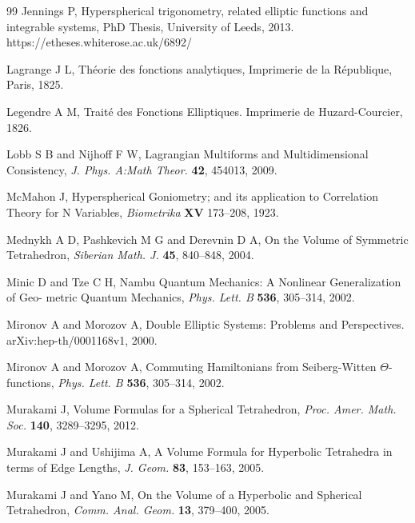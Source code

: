 \documentclass[fleqn,11pt,twoside]{article}
\theoremstyle{definition}
\begin{document}
\begin{thebibliography}{99}
Jennings P, Hyperspherical trigonometry, related elliptic functions and integrable systems, PhD Thesis, University of Leeds, 2013. 
https://etheses.whiterose.ac.uk/6892/

Lagrange J L, Th\'eorie des fonctions analytiques, Imprimerie de la R\'epublique, Paris, 1825. 

Legendre A M, Trait\'e des Fonctions Elliptiques. Imprimerie de Huzard-Courcier, 1826.


Lobb S B and Nijhoff F W, Lagrangian Multiforms and Multidimensional Consistency,
{\it J. Phys. A:Math Theor.} {\bf 42}, 454013, 2009.

McMahon J, Hyperspherical Goniometry; and its application to Correlation Theory for
N Variables, {\it Biometrika} {\bf XV} 173--208, 1923.


Mednykh A D, Pashkevich M G and Derevnin D A, On the Volume of 
Symmetric Tetrahedron, {\it Siberian Math. J.} {\bf 45}, 840--848, 2004.

Minic D and Tze C H, Nambu Quantum Mechanics: A Nonlinear Generalization of Geo-
metric Quantum Mechanics, {\it Phys. Lett. B} {\bf 536}, 305--314, 2002.



Mironov A and Morozov A,
Double Elliptic Systems: Problems and Perspectives.
arXiv:hep-th/0001168v1, 2000.

Mironov A and Morozov A, 
Commuting Hamiltonians from Seiberg-Witten $\Theta$-functions, 
{\it Phys. Lett. B} {\bf 536}, 305--314, 2002. 

Murakami J, Volume Formulas for a Spherical Tetrahedron, {\it Proc. Amer. 
Math. Soc.} {\bf 140}, 3289--3295, 2012.

Murakami J and Ushijima A, A Volume Formula for Hyperbolic Tetrahedra in terms of
Edge Lengths, {\it J. Geom.} {\bf 83}, 153--163, 2005.

Murakami J and Yano M, On the Volume of a Hyperbolic and Spherical Tetrahedron, 
{\it Comm. Anal. Geom.} {\bf 13}, 379--400, 2005.


\end{thebibliography}
\end{document}
